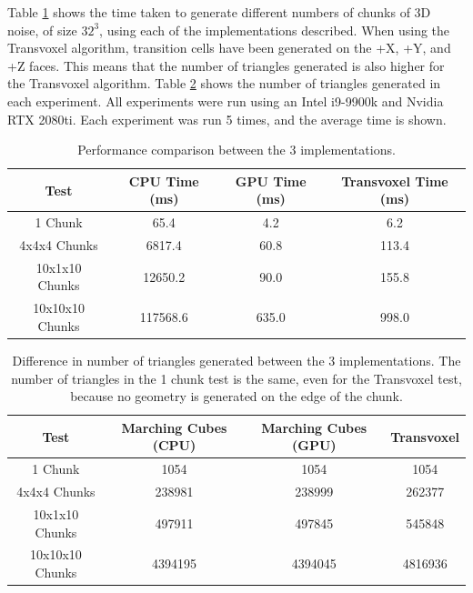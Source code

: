 \documentclass[11pt]{article}
\begin{document}
Table \ref{tab:comparison-time} shows the time taken to generate different numbers of chunks of 3D noise, of size $32^3$, using each of the implementations described. When using the Transvoxel algorithm, transition cells have been generated on the +X, +Y, and +Z faces. This means that the number of triangles generated is also higher for the Transvoxel algorithm. Table \ref{tab:comparison-tris} shows the number of triangles generated in each experiment. All experiments were run using an Intel i9-9900k and Nvidia RTX 2080ti. Each experiment was run 5 times, and the average time is shown.
\begin{table}[H]
  \begin{tabular}{|c|c|c|c|}
    \hline
    Test & CPU Time (ms) & GPU Time (ms) & Transvoxel Time (ms)\\
    \hline
    \hline
    1 Chunk & 65.4 & 4.2 & 6.2\\
    4x4x4 Chunks &  6817.4 & 60.8 & 113.4\\
    10x1x10 Chunks & 12650.2 & 90.0 & 155.8\\
    10x10x10 Chunks & 117568.6 & 635.0 & 998.0\\
    \hline
    
  \end{tabular}
  \caption{\label{tab:comparison-time}Performance comparison between the 3 implementations.}
\end{table}


\begin{table}[H]
  \begin{tabular}{|c|c|c|c|}
    \hline
    Test & Marching Cubes (CPU) & Marching Cubes (GPU) & Transvoxel\\
    \hline
    \hline
    1 Chunk & 1054 & 1054 & 1054\\
    4x4x4 Chunks & 238981 & 238999 & 262377\\
    10x1x10 Chunks & 497911 & 497845 & 545848\\
    10x10x10 Chunks & 4394195 & 4394045 & 4816936\\
    \hline
  \end{tabular}
  \caption{\label{tab:comparison-tris}Difference in number of triangles generated between the 3 implementations. The number of triangles in the 1 chunk test is the same, even for the Transvoxel test, because no geometry is generated on the edge of the chunk.}
\end{table}
\end{document}

